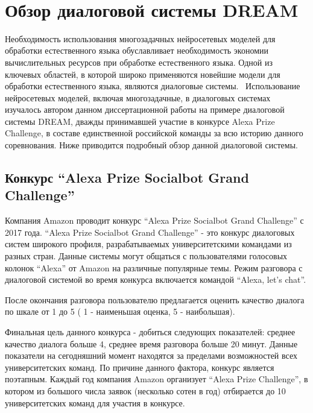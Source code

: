   \chapter{  Обзор диалоговой системы DREAM}\label{ch:dream} 


Необходимость использования многозадачных нейросетевых моделей для обработки естественного языка обуславливает необходимость экономии вычислительных ресурсов при обработке естественного языка. Одной из ключевых областей, в которой широко применяются новейшие модели для обработки естественного языка, являются диалоговые системы.  Использование нейросетевых моделей, включая многозадачные, в диалоговых системах изучалось автором данном диссертационной работы на примере диалоговой системы DREAM, дважды принимавшей участие в конкурсе Alexa Prize Challenge, в составе единственной российской команды за всю историю данного соревнования. Ниже приводится подробный обзор данной диалоговой системы.

\section{Конкурс “Alexa Prize Socialbot Grand Challenge”}

Компания Amazon проводит конкурс “Alexa Prize Socialbot Grand Challenge” с 2017 года. “Alexa Prize Socialbot Grand Challenge” - это конкурс диалоговых систем широкого профиля, разрабатываемых университетскими командами из разных стран. Данные системы могут общаться с пользователями голосовых колонок “Alexa” от Amazon на различные популярные темы. Режим разговора с диалоговой системой во время конкурса включается командой “Alexa, let’s chat”.

После окончания разговора пользователю предлагается оценить качество диалога по шкале от 1 до 5 ( 1 - наименьшая оценка, 5 - наибольшая). 

Финальная цель данного конкурса - добиться следующих показателей: среднее качество диалога больше 4, среднее время разговора больше 20 минут. Данные показатели на сегодняшний момент находятся за пределами возможностей всех университетских команд. По причине данного фактора, конкурс является поэтапным. Каждый год компания Amazon организует “Alexa Prize Challenge”, в котором из большого числа заявок (несколько сотен в год) отбирается до 10 университетских команд для участия в конкурсе.

